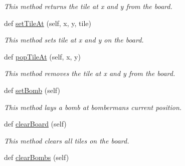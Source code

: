 \begin{DoxyCompactItemize}
\begin{DoxyCompactList}\small\item\em This method returns the tile at x and y from the board. \end{DoxyCompactList}\item 
\hypertarget{classsrc_1_1level_1_1_level_a1b0a565e03f055cd93abe6faeefd3b4f}{}def \hyperlink{classsrc_1_1level_1_1_level_a1b0a565e03f055cd93abe6faeefd3b4f}{set\+Tile\+At} (self, x, y, tile)\label{classsrc_1_1level_1_1_level_a1b0a565e03f055cd93abe6faeefd3b4f}

\begin{DoxyCompactList}\small\item\em This method sets tile at x and y on the board. \end{DoxyCompactList}\item 
\hypertarget{classsrc_1_1level_1_1_level_a79a922117841f374126a4ab727a65ef1}{}def \hyperlink{classsrc_1_1level_1_1_level_a79a922117841f374126a4ab727a65ef1}{pop\+Tile\+At} (self, x, y)\label{classsrc_1_1level_1_1_level_a79a922117841f374126a4ab727a65ef1}

\begin{DoxyCompactList}\small\item\em This method removes the tile at x and y from the board. \end{DoxyCompactList}\item 
\hypertarget{classsrc_1_1level_1_1_level_aa1fdbf2a27cb66fffd27bc2598449072}{}def \hyperlink{classsrc_1_1level_1_1_level_aa1fdbf2a27cb66fffd27bc2598449072}{set\+Bomb} (self)\label{classsrc_1_1level_1_1_level_aa1fdbf2a27cb66fffd27bc2598449072}

\begin{DoxyCompactList}\small\item\em This method lays a bomb at bomberman\textquotesingle{}s current position. \end{DoxyCompactList}\item 
\hypertarget{classsrc_1_1level_1_1_level_ab1083324efb6eddfdfc04316a85f7f15}{}def \hyperlink{classsrc_1_1level_1_1_level_ab1083324efb6eddfdfc04316a85f7f15}{clear\+Board} (self)\label{classsrc_1_1level_1_1_level_ab1083324efb6eddfdfc04316a85f7f15}

\begin{DoxyCompactList}\small\item\em This method clears all tiles on the board. \end{DoxyCompactList}\item 
\hypertarget{classsrc_1_1level_1_1_level_a5cacfb3b893af155c71dfffc3ae042bd}{}def \hyperlink{classsrc_1_1level_1_1_level_a5cacfb3b893af155c71dfffc3ae042bd}{clear\+Bombs} (self)\label{classsrc_1_1level_1_1_level_a5cacfb3b893af155c71dfffc3ae042bd}


\end{DoxyCompactItemize}
